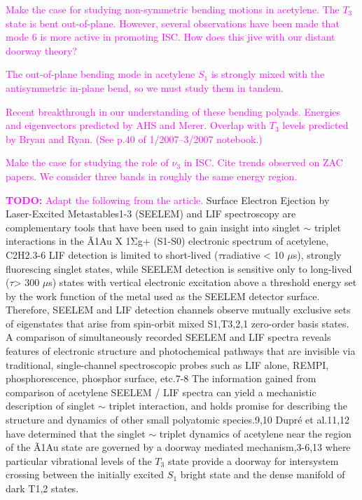\documentclass[12pt,draft]{mitthesis}
\newcommand{\TODO} [1]{\textcolor{magenta}{\textbf{TODO:} #1}}
\newcommand{\POINT}[1]{\textcolor{magenta}{#1}}
\begin{document}
\POINT{Make the case for studying non-symmetric bending motions in
  acetylene.  The $T_3$ state is bent out-of-plane.  However, several
  observations have been made that mode 6 is more active in promoting
  ISC.  How does this jive with our distant doorway theory?}

\POINT{The out-of-plane bending mode in acetylene $S_1$ is strongly
  mixed with the antisymmetric in-plane bend, so we must study them in
  tandem.}

\POINT{Recent breakthrough in our understanding of these bending
  polyads.  Energies and eigenvectors predicted by AHS and Merer.
  Overlap with $T_3$ levels predicted by Bryan and Ryan.  (See p.40 of
  1/2007--3/2007 notebook.)}

\POINT{Make the case for studying the role of $\nu_3$ in ISC.  Cite
  trends observed on ZAC papers.  We consider three bands in roughly
  the same energy region.}

\TODO{Adapt the following from the article.}  Surface Electron
Ejection by Laser-Excited Metastables1-3 (SEELEM) and LIF spectroscopy
are complementary tools that have been used to gain insight into
singlet $\sim$ triplet interactions in the Ã1Au X 1Σg+ (S1-S0) electronic
spectrum of acetylene, C2H2.3-6 LIF detection is limited to
short-lived ($\tau$radiative < 10 $\mu$s), strongly fluorescing singlet
states, while SEELEM detection is sensitive only to long-lived ($\tau$>
300 $\mu$s) states with vertical electronic excitation above a threshold
energy set by the work function of the metal used as the SEELEM
detector surface. Therefore, SEELEM and LIF detection channels observe
mutually exclusive sets of eigenstates that arise from spin-orbit
mixed S1,T3,2,1 zero-order basis states.  A comparison of
simultaneously recorded SEELEM and LIF spectra reveals features of
electronic structure and photochemical pathways that are invisible via
traditional, single-channel spectroscopic probes such as LIF alone,
REMPI, phosphorescence, phosphor surface, etc.7-8 The information
gained from comparison of acetylene SEELEM / LIF spectra can yield a
mechanistic description of singlet $\sim$ triplet interaction, and holds
promise for describing the structure and dynamics of other small
polyatomic species.9,10 Dupré et al.11,12 have determined that the
singlet $\sim$ triplet dynamics of acetylene near the region of the Ã1Au
state are governed by a doorway mediated mechanism,3-6,13 where
particular vibrational levels of the $T_3$ state provide a doorway for
intersystem crossing between the initially excited $S_1$ bright state and
the dense manifold of dark T1,2 states.
\end{document}
